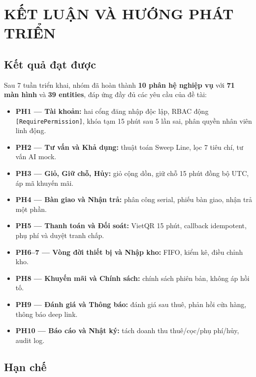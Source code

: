\chapter*{KẾT LUẬN VÀ HƯỚNG PHÁT TRIỂN}

\section*{Kết quả đạt được}

Sau 7 tuần triển khai, nhóm đã hoàn thành \textbf{10 phân hệ nghiệp vụ} với \textbf{71 màn hình} và \textbf{39 entities}, đáp ứng đầy đủ các yêu cầu của đề tài:

\begin{itemize}
  \item \textbf{PH1 --- Tài khoản:} hai cổng đăng nhập độc lập, RBAC động \texttt{[RequirePermission]}, khóa tạm 15 phút sau 5 lần sai, phân quyền nhân viên linh động.
  \item \textbf{PH2 --- Tư vấn và Khả dụng:} thuật toán Sweep Line, lọc 7 tiêu chí, tư vấn AI mock.
  \item \textbf{PH3 --- Giỏ, Giữ chỗ, Hủy:} giỏ cộng dồn, giữ chỗ 15 phút đồng bộ UTC, áp mã khuyến mãi.
  \item \textbf{PH4 --- Bàn giao và Nhận trả:} phân công serial, phiếu bàn giao, nhận trả một phần.
  \item \textbf{PH5 --- Thanh toán và Đối soát:} VietQR 15 phút, callback idempotent, phụ phí và duyệt tranh chấp.
  \item \textbf{PH6--7 --- Vòng đời thiết bị và Nhập kho:} FIFO, kiểm kê, điều chỉnh kho.
  \item \textbf{PH8 --- Khuyến mãi và Chính sách:} chính sách phiên bản, không áp hồi tố.
  \item \textbf{PH9 --- Đánh giá và Thông báo:} đánh giá sau thuê, phản hồi cửa hàng, thông báo deep link.
  \item \textbf{PH10 --- Báo cáo và Nhật ký:} tách doanh thu thuê/cọc/phụ phí/hủy, audit log.
\end{itemize}

\section*{Hạn chế}

